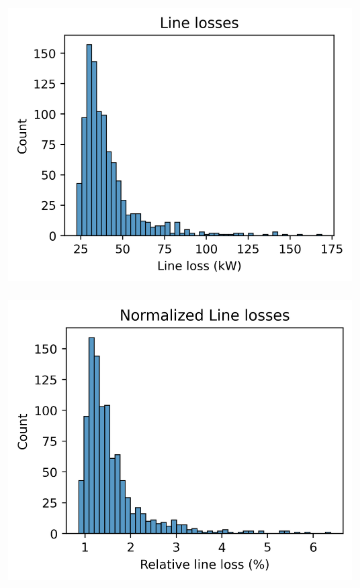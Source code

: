 \begin{figure}[H]
\begin{subfigure}{.33\textwidth}
      \caption{}
      \label{fig:appendix:suburb2:histograms:max_trafo}
    \end{subfigure}%
    \begin{subfigure}{.33\textwidth}
      \centering
      \includegraphics[width=\linewidth]{img/switchstate_exploring/suburb2/histograms/line_loss.png}
      \caption{}
      \label{fig:appendix:suburb2:histograms:line_loss}
    \end{subfigure}%
    \begin{subfigure}{.33\textwidth}
      \centering
      \includegraphics[width=\linewidth]{img/switchstate_exploring/suburb2/histograms/line_loss_relative.png}

\end{subfigure}
\end{figure}
